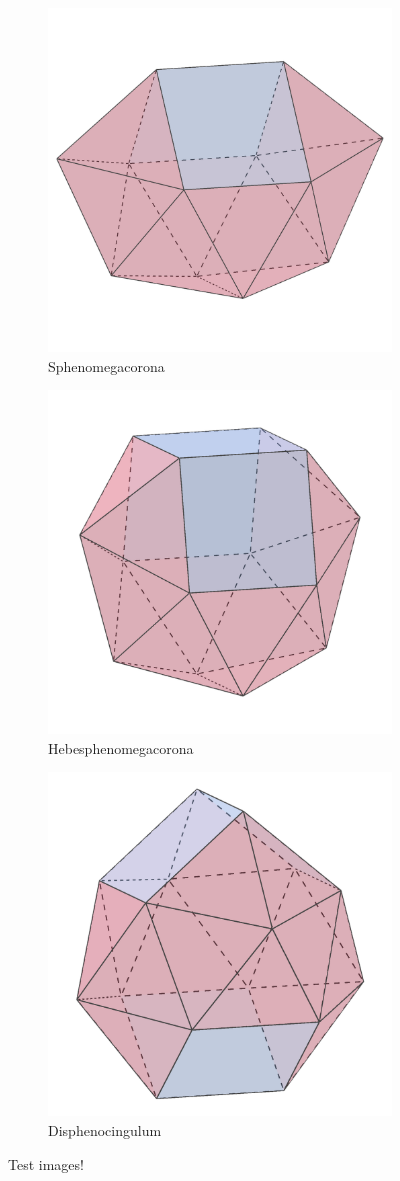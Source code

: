 \documentclass{article}
\begin{document}
\begin{figure}[h]
\centering
\begin{subfigure}{.33333\textwidth}
  \centering
  \includegraphics[width=.5\linewidth]{Sphenomegacorona}
  \caption{Sphenomegacorona}
  \label{fig:polyhedra_1}
\end{subfigure}%
\begin{subfigure}{.33333\textwidth}
  \centering
  \includegraphics[width=.5\linewidth]{Hebesphenomegacorona}
  \caption{Hebesphenomegacorona}
  \label{fig:polyhedra_2}
\end{subfigure}%
\begin{subfigure}{.33333\textwidth}
  \centering
  \includegraphics[width=.5\linewidth]{Disphenocingulum}
  \caption{Disphenocingulum}
  \label{fig:polyhedra_3}
\end{subfigure}%
\caption{Test images!}
\label{fig:polyhedra}
\end{figure}
\end{document}
